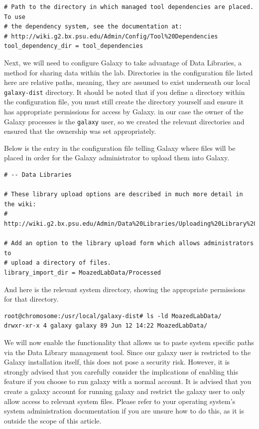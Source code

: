 \documentclass[a4paper,10pt]{article}
\begin{document}
\begin{lstlisting}
# Path to the directory in which managed tool dependencies are placed.  To use
# the dependency system, see the documentation at:
# http://wiki.g2.bx.psu.edu/Admin/Config/Tool%20Dependencies
tool_dependency_dir = tool_dependencies
\end{lstlisting}

Next, we will need to configure Galaxy to take advantage of Data Libraries, a method for sharing data within the lab.  Directories in the configuration file listed here are relative paths, meaning, they are assumed to exist underneath our local \texttt{\footnotesize{galaxy-dist}} directory.  It should be noted that if you define a directory within the configuration file, you must still create the directory yourself and ensure it has appropriate permissions for access by Galaxy.  in our case the owner of the Galaxy processes is the \texttt{\footnotesize{galaxy}} user, so we created the relevant directories and ensured that the ownership was set appropriately.

Below is the entry in the configuration file telling Galaxy where files will be placed in order for the Galaxy administrator to upload them into Galaxy.

\begin{lstlisting}
# -- Data Libraries

# These library upload options are described in much more detail in the wiki:
# http://wiki.g2.bx.psu.edu/Admin/Data%20Libraries/Uploading%20Library%20Files

# Add an option to the library upload form which allows administrators to
# upload a directory of files.
library_import_dir = MoazedLabData/Processed
\end{lstlisting}

And here is the relevant system directory, showing the appropriate permissions for that directory.

\begin{lstlisting}
root@chromosome:/usr/local/galaxy-dist# ls -ld MoazedLabData/
drwxr-xr-x 4 galaxy galaxy 89 Jun 12 14:22 MoazedLabData/
\end{lstlisting}

We will now enable the functionality that allows us to paste system specific paths via the Data Library management tool.  Since our galaxy user is restricted to the Galaxy installation itself, this does not pose a security risk.  However, it is strongly advised that you carefully consider the implications of enabling this feature if you choose to run galaxy with a normal account.  It is advised that you create a galaxy account for running galaxy and restrict the galaxy user to only allow access to relevant system files.  Please refer to your operating system's system administration documentation if you are unsure how to do this, as it is outside the scope of this article.
\end{document}
